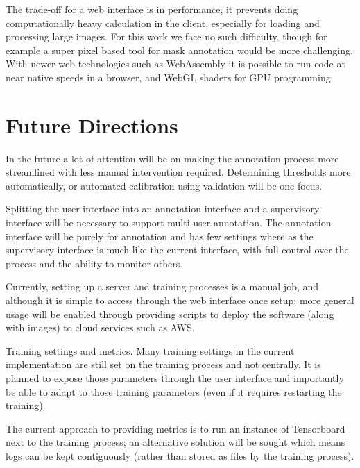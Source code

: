 The trade-off for a web interface is in performance, it prevents doing computationally heavy calculation in the client, especially for loading and processing large images. For this work we face no such difficulty, though for example a super pixel based tool for mask annotation would be more challenging. With newer web technologies such as WebAssembly \cite{Haas2017} it is possible to run code at near native speeds in a browser, and WebGL shaders for GPU programming.



\section{Future Directions}
\label{sec:design_future_direction}

In the future a lot of attention will be on making the annotation process more streamlined with less manual intervention required. Determining thresholds more automatically, or automated calibration using validation will be one focus.

Splitting the user interface into an annotation interface and a supervisory interface will be necessary to support multi-user annotation. The annotation interface will be purely for annotation and has few settings where as the supervisory interface is much like the current interface, with full control over the process and the ability to monitor others.

Currently, setting up a server and training processes is a manual job, and although it is simple to access through the web interface once setup; more general usage will be enabled through providing scripts to deploy the software (along with images) to cloud services such as \gls{AWS}. 

Training settings and metrics. Many training settings in the current implementation are still set on the training process and not centrally. It is planned to expose those parameters through the user interface and importantly be able to adapt to those training parameters (even if it requires restarting the training).

The current approach to providing metrics is to run an instance of Tensorboard next to the training process; an alternative solution will be sought which means logs can be kept contiguously (rather than stored as files by the training process).

